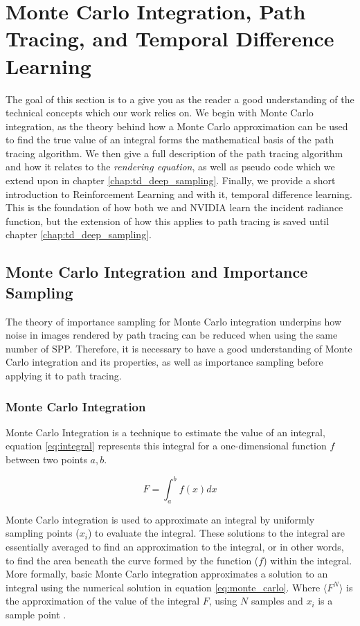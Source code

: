 \documentclass[../dissertation.tex]{subfiles}
\begin{document}
\chapter{Monte Carlo Integration, Path Tracing, and Temporal Difference Learning}
\label{chap:technical}

The goal of this section is to a give you as the reader a good understanding of  the technical concepts which our work relies on. We begin with Monte Carlo integration, as the theory behind how a Monte Carlo approximation can be used to find the true value of an integral forms the mathematical basis of the path tracing algorithm. We then give a full description of the path tracing algorithm and how it relates to the \textit{rendering equation}, as well as pseudo code which we extend upon in chapter \ref{chap:td_deep_sampling}. Finally, we provide a short introduction to Reinforcement Learning and with it, temporal difference learning. This is the foundation of how both we and NVIDIA learn the incident radiance function, but the extension of how this applies to path tracing is saved until chapter \ref{chap:td_deep_sampling}.

\section{Monte Carlo Integration and Importance Sampling}
\label{sec:monte_carlo}
The theory of importance sampling for Monte Carlo integration underpins how noise in images rendered by path tracing can be reduced when using the same number of SPP. Therefore, it is necessary to have a good understanding of Monte Carlo integration and its properties, as well as importance sampling before applying it to path tracing.

\subsection{Monte Carlo Integration}
\label{sec:monte_carlo_approx}
 Monte Carlo Integration is a technique to estimate the value of an integral, equation \ref{eq:integral} represents this integral for a one-dimensional function $f$ between two points $a,b$.

\begin{equation}
\label{eq:integral}
F = \int_a^b f(x) dx
\end{equation}

Monte Carlo integration is used to approximate an integral by uniformly sampling points ($x_i$) to evaluate the integral. These solutions to the integral are essentially averaged to find an approximation to the integral, or in other words, to find the area beneath the curve formed by the function ($f$) within the integral. More formally, basic Monte Carlo integration approximates a solution to an integral using the numerical solution in equation \ref{eq:monte_carlo}. Where $\langle F^N \rangle$ is the approximation of the value of the integral $F$, using $N$ samples and $x_i$ is a sample point \cite{morokoff1995quasi}.
\end{document}
